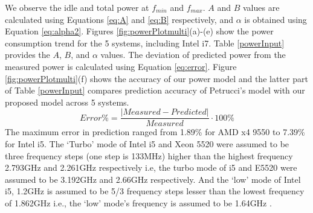 \documentclass{sig-alternate}
\begin{document}
We observe the idle and total power at $f_{min}$ and $f_{max}$. $A$ and $B$ values are calculated using Equations \ref{eq:A} and \ref{eq:B} respectively, and $\alpha$ is obtained using Equation \ref{eq:alpha2}. Figures \ref{fig:powerPlotmulti}(a)-(e) show the power consumption trend for the 5 systems, including Intel i7. Table \ref{powerInput} provides the $A$, $B$, and $\alpha$ values. The deviation of predicted power from the measured power is calculated using Equation \ref{eq:error}. Figure \ref{fig:powerPlotmulti}(f) shows the accuracy of our power model and the latter part of Table \ref{powerInput} compares prediction accuracy of Petrucci's model \cite{Petrucci2011} with our proposed model across 5 systems. 
\begin{equation}
\label{eq:error}
Error\% = \frac{|Measured - Predicted|}{Measured} \cdot 100\% 
\end{equation}
The maximum error in prediction ranged from 1.89\% for AMD x4 9550 to 7.39\% for Intel i5. The `Turbo' mode of Intel i5 and Xeon 5520 were assumed to be three frequency steps (one step is 133MHz) higher than the highest frequency 2.793GHz and 2.261GHz respectively i.e, the turbo mode of i5 and E5520 were assumed to be 3.192GHz and 2.66GHz respectively. And the `low' mode of Intel i5, 1.2GHz is assumed to be 5/3 frequency steps lesser than the lowest frequency of 1.862GHz i.e., the `low' mode's frequency is assumed to be 1.64GHz \cite{Li2008}. 
\end{document}
